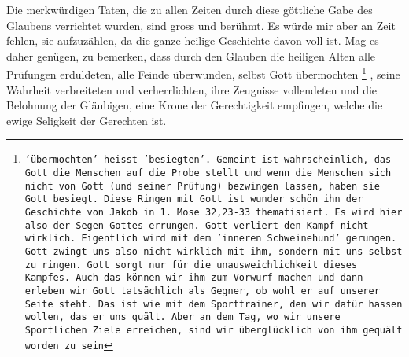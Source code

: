 Die merkwürdigen Taten, die zu allen Zeiten durch diese göttliche Gabe des
Glaubens verrichtet wurden, sind gross und berühmt. Es würde mir aber an Zeit
fehlen, sie aufzuzählen, da die ganze heilige Geschichte davon voll ist. Mag es
daher genügen, zu bemerken, dass durch den Glauben die heiligen Alten alle
Prüfungen erduldeten, alle Feinde überwunden, selbst Gott
übermochten \footnote{\texttt{'übermochten' heisst 'besiegten'. Gemeint ist
wahrscheinlich, das Gott die Menschen auf die Probe stellt und wenn die Menschen
sich nicht von Gott (und seiner Prüfung) bezwingen lassen, haben sie Gott
besiegt. Diese Ringen mit Gott ist wunder schön ihn der Geschichte von Jakob in
1. Mose 32,23-33 thematisiert. Es wird hier also der Segen Gottes
errungen. Gott verliert den Kampf nicht wirklich. Eigentlich wird
mit dem 'inneren Schweinehund' gerungen. Gott zwingt uns also nicht
wirklich mit ihm, sondern mit uns selbst zu ringen. Gott sorgt
nur für die unausweichlichkeit dieses Kampfes. Auch das können
wir ihm zum Vorwurf machen und dann erleben wir Gott tatsächlich
als Gegner, ob wohl er auf unserer Seite steht. Das ist wie mit
dem Sporttrainer, den wir dafür hassen wollen, das er uns quält.
Aber an dem Tag, wo wir unsere Sportlichen Ziele erreichen, sind
wir überglücklich von ihm gequält worden zu sein}}
, seine
Wahrheit verbreiteten und verherrlichten, ihre
Zeugnisse vollendeten und die
Belohnung der Gläubigen, eine Krone der
Gerechtigkeit empfingen, welche die
ewige Seligkeit der Gerechten ist.





